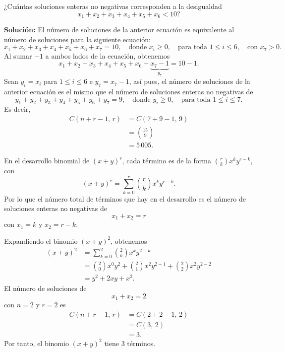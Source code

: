 \begin{myexample}
    ¿Cuántas soluciones enteras no negativas corresponden a la desigualdad
    $$x_1 + x_2 + x_3 + x_4 + x_5 + x_6 < 10?$$

    \tcblower
    \textbf{\color{jblueleft}Solución:} El número de soluciones de la anterior ecuación es equivalente al número de soluciones para la siguiente ecuación:
    $$x_1 + x_2 + x_3 + x_4 + x_5 + x_6 + x_7= 10, \quad \text{donde } x_i \geq 0, \quad \text{para toda } 1 \leq i \leq 6, \quad \text{con } x_7 > 0.$$
    Al sumar $-1$ a ambos lados de la ecuación, obtenemos
    $$x_1 + x_2 + x_3 + x_4 + x_5 + x_6 + \underbrace{x_7 - 1}_{y_{7}} = 10 - 1.$$
    Sean $y_i = x_i$ para $1 \leq i \leq 6$ e $y_7 = x_7 - 1$, así pues, el número de soluciones de la anterior ecuación es el mismo que el número de soluciones enteras no negativas de
    $$y_1 + y_2 + y_3 + y_4 + y_5 + y_6 + y_7= 9, \quad \text{donde } y_i \geq 0, \quad \text{para toda } 1 \leq i \leq 7.$$
    Es decir,
    \begin{align*}
        C(n + r - 1, \, r) & = C(7 + 9 - 1, \, 9) \\
        & = \binom{15}{9} \\
        & = 5 \, 005.
    \end{align*}
\end{myexample}

\begin{myexample}
    En el desarrollo binomial de $(x + y)^r$, cada término es de la forma $\displaystyle \binom{r}{k} x^ky^{r-k}$, con
    $$(x + y)^r = \sum_{k=0}^{r} \binom{r}{k} x^ky^{r-k}.$$
    Por lo que el número total de términos que hay en el desarrollo es el número de soluciones enteras no negativas de 
    $$x_1 + x_2 = r$$
    con $x_1 = k$ y $x_2 = r - k$.
\end{myexample}

\newpage

\begin{myexample}
    Expandiendo el binomio $(x + y)^2$, obtenemos
    \begin{align*}
        (x + y)^2 & = \sum_{k=0}^{2} \binom{2}{k}x^ky^{2-k} \\
        & = \binom{2}{0} x^0y^2 + \binom{2}{1}x^2y^{2-1} + \binom{2}{2} x^2y^{2-2} \\
        & = y^2 + 2xy + x^2.
    \end{align*}
    El número de soluciones de
    $$x_1 + x_2 = 2$$
    con $n = 2$ y $r = 2$ es
    \begin{align*}
        C(n + r - 1, \, r) & = C(2 + 2 - 1, \, 2) \\
        & = C(3, \, 2) \\
        & = 3.
    \end{align*}
    Por tanto, el binomio $(x + y)^2$ tiene 3 términos.
\end{myexample}

